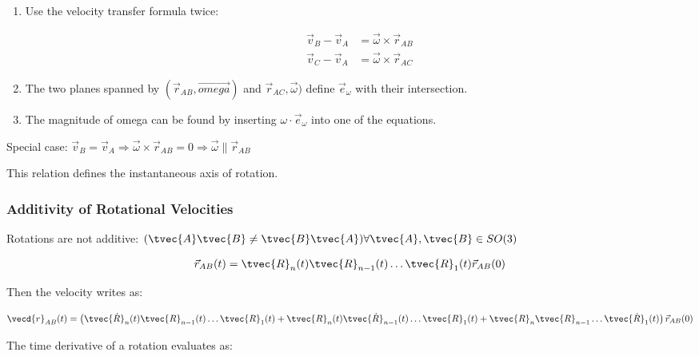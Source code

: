 \documentclass[10pt,a4paper]{scrartcl}
\begin{document}
\begin{multicols*}{2}
\begin{enumerate}
\item Use the velocity transfer formula twice:

\begin{align*}
\vec{v}_B-\vec{v}_A&=\vec{\omega}\times\vec{r}_{AB}\\
\vec{v}_C-\vec{v}_A&=\vec{\omega}\times\vec{r}_{AC}
\end{align*}

\item The two planes spanned by $(\vec{r}_{AB},\vec{omega})$ and $\vec{r}_{AC},\vec{\omega})$ define $\vec{e}_\omega$ with their intersection.

\item The magnitude of omega can be found by inserting $\omega\cdot\vec{e}_{\omega}$ into one of the equations.
\end{enumerate}

Special case: $\vec{v}_B=\vec{v}_A\Rightarrow\vec{\omega}\times\vec{r}_{AB}=0\Rightarrow\vec{\omega}\parallel\vec{r}_{AB}$

This relation defines the instantaneous axis of rotation.

\subsubsection{Additivity of Rotational Velocities}

Rotations are not additive: $(\tvec{A}\tvec{B}\neq\tvec{B}\tvec{A})\forall\tvec{A},\tvec{B}\in SO(3)$

\begin{align*}
\vec{r}_{AB}(t)=\tvec{R}_n(t)\tvec{R}_{n-1}(t)\ldots\tvec{R}_1(t)\vec{r}_{AB}(0)
\end{align*}

Then the velocity writes as:

\begin{align*}
\vecd{r}_{AB}(t)=\left(\tvec{\dot{R}}_n(t)\tvec{R}_{n-1}(t)\ldots\tvec{R}_1(t)+\tvec{R}_n(t)\tvec{\dot{R}}_{n-1}(t)\ldots\tvec{R}_1(t)+\tvec{R}_n\tvec{R}_{n-1}\ldots\tvec{\dot{R}}_1(t)\right)\vec{r}_{AB}(0)
\end{align*}

The time derivative of a rotation evaluates as:



\end{multicols*}
\end{document}
